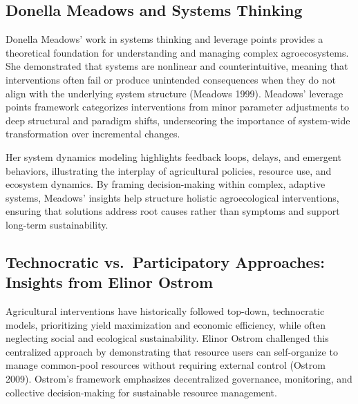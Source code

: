\documentclass[
]{article}
\begin{document}
\hypertarget{donella-meadows-and-systems-thinking}{%
\subsection*{Donella Meadows and Systems
Thinking}\label{donella-meadows-and-systems-thinking}}

Donella Meadows' work in systems thinking and leverage points provides a
theoretical foundation for understanding and managing complex
agroecosystems. She demonstrated that systems are nonlinear and
counterintuitive, meaning that interventions often fail or produce
unintended consequences when they do not align with the underlying
system structure (Meadows 1999). Meadows' leverage points framework
categorizes interventions from minor parameter adjustments to deep
structural and paradigm shifts, underscoring the importance of
system-wide transformation over incremental changes.

Her system dynamics modeling highlights feedback loops, delays, and
emergent behaviors, illustrating the interplay of agricultural policies,
resource use, and ecosystem dynamics. By framing decision-making within
complex, adaptive systems, Meadows' insights help structure holistic
agroecological interventions, ensuring that solutions address root
causes rather than symptoms and support long-term sustainability.

\hypertarget{technocratic-vs.-participatory-approaches-insights-from-elinor-ostrom}{%
\subsection*{Technocratic vs.~Participatory Approaches: Insights from
Elinor
Ostrom}\label{technocratic-vs.-participatory-approaches-insights-from-elinor-ostrom}}

Agricultural interventions have historically followed top-down,
technocratic models, prioritizing yield maximization and economic
efficiency, while often neglecting social and ecological sustainability.
Elinor Ostrom challenged this centralized approach by demonstrating that
resource users can self-organize to manage common-pool resources without
requiring external control (Ostrom 2009). Ostrom's framework emphasizes
decentralized governance, monitoring, and collective decision-making for
sustainable resource management.
\end{document}
